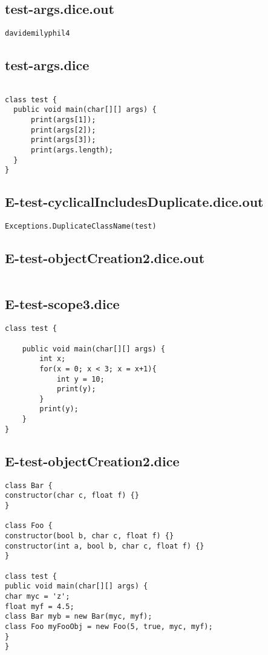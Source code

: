 \subsection{test-args.dice.out}
\begin{verbatim}
davidemilyphil4
\end{verbatim}
\pagebreak
\subsection{test-args.dice}
\begin{verbatim}

class test {
  public void main(char[][] args) {
      print(args[1]);
      print(args[2]);
      print(args[3]);
      print(args.length);
  }
}
\end{verbatim}
\pagebreak
\subsection{E-test-cyclicalIncludesDuplicate.dice.out}
\begin{verbatim}
Exceptions.DuplicateClassName(test)

\end{verbatim}
\pagebreak
\subsection{E-test-objectCreation2.dice.out}
\begin{verbatim}

\end{verbatim}
\pagebreak
\subsection{E-test-scope3.dice}
\begin{verbatim}
class test {

	public void main(char[][] args) {
		int x;
		for(x = 0; x < 3; x = x+1){
			int y = 10;
			print(y);
		}
		print(y);
	}
}
\end{verbatim}
\pagebreak
\subsection{E-test-objectCreation2.dice}
\begin{verbatim}
class Bar {
constructor(char c, float f) {}
}

class Foo {
constructor(bool b, char c, float f) {}
constructor(int a, bool b, char c, float f) {}
}

class test {
public void main(char[][] args) {
char myc = 'z';
float myf = 4.5;
class Bar myb = new Bar(myc, myf);
class Foo myFooObj = new Foo(5, true, myc, myf);
}
}
\end{verbatim}
\pagebreak
